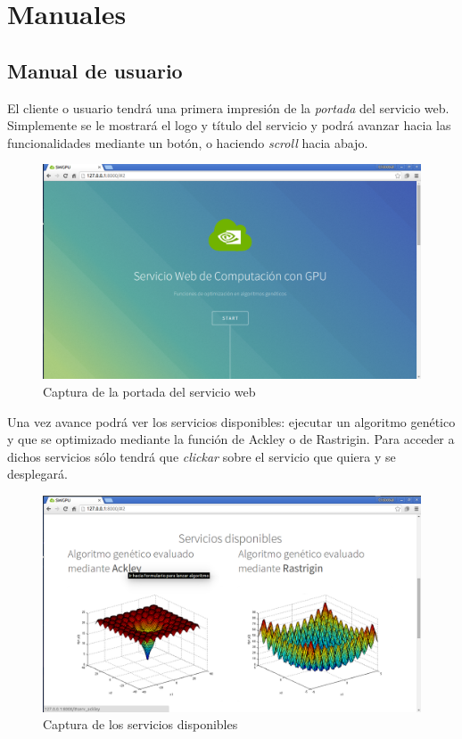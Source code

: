 \chapter{Manuales}


\section{Manual de usuario}
\bigskip

El cliente o usuario tendrá una primera impresión de la \textit{portada} del servicio web. Simplemente se le mostrará el logo y título del servicio y podrá avanzar hacia las funcionalidades mediante un botón, o haciendo \textit{scroll} hacia abajo.

\bigskip
\begin{figure}[h]
	\centering
	\includegraphics[width=1\linewidth]{../images/captura_web_1}
	\caption[Captura de la portada del servicio web]{Captura de la portada del servicio web}
	\label{fig:captura_web_1}
\end{figure}


Una vez avance podrá ver los servicios disponibles: ejecutar un algoritmo genético y que se optimizado mediante la función de Ackley o de Rastrigin. Para acceder a dichos servicios sólo tendrá que \textit{clickar} sobre el servicio que quiera y se desplegará.

\bigskip
\begin{figure}[h]
	\centering
	\includegraphics[width=0.9\linewidth]{../images/captura_web_2}
	\caption[Captura de los servicios disponibles]{Captura de los servicios disponibles}
	\label{fig:captura_web_2}
\end{figure}


